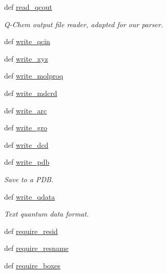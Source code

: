 \begin{DoxyCompactItemize}
\item 
def \hyperlink{classforcebalance_1_1molecule_1_1Molecule_a8c9e71843e7123c57c43c24af2d84f25}{read\-\_\-qcout}
\begin{DoxyCompactList}\small\item\em Q-\/\-Chem output file reader, adapted for our parser. \end{DoxyCompactList}\item 
def \hyperlink{classforcebalance_1_1molecule_1_1Molecule_af46b2ba6ef777cf8301bc16e157c724d}{write\-\_\-qcin}
\item 
def \hyperlink{classforcebalance_1_1molecule_1_1Molecule_adc6620e8287edabe161442de12295f75}{write\-\_\-xyz}
\item 
def \hyperlink{classforcebalance_1_1molecule_1_1Molecule_aba14226f272f91c91ecf7060ff136a2b}{write\-\_\-molproq}
\item 
def \hyperlink{classforcebalance_1_1molecule_1_1Molecule_aab5ea35ab9d68559fd6ea7b747c2bddb}{write\-\_\-mdcrd}
\item 
def \hyperlink{classforcebalance_1_1molecule_1_1Molecule_a95782abfb36e7080a1b98bfad2ced4f3}{write\-\_\-arc}
\item 
def \hyperlink{classforcebalance_1_1molecule_1_1Molecule_a503eae2cee228e4cc5fc736504714925}{write\-\_\-gro}
\item 
def \hyperlink{classforcebalance_1_1molecule_1_1Molecule_a0dee435704418bf51199d6bab6d92249}{write\-\_\-dcd}
\item 
def \hyperlink{classforcebalance_1_1molecule_1_1Molecule_a47082443566cd50add3f2ec20af9cc10}{write\-\_\-pdb}
\begin{DoxyCompactList}\small\item\em Save to a P\-D\-B. \end{DoxyCompactList}\item 
def \hyperlink{classforcebalance_1_1molecule_1_1Molecule_a1ef6aefd3218f8ab3f9dc2b37e602fbf}{write\-\_\-qdata}
\begin{DoxyCompactList}\small\item\em Text quantum data format. \end{DoxyCompactList}\item 
def \hyperlink{classforcebalance_1_1molecule_1_1Molecule_a90fe456919fda305703e36af389e60e1}{require\-\_\-resid}
\item 
def \hyperlink{classforcebalance_1_1molecule_1_1Molecule_ad47d05a3ea76e013a628bd7b25ae3050}{require\-\_\-resname}
\item 
def \hyperlink{classforcebalance_1_1molecule_1_1Molecule_a03af3cfb99ea8f1c8c7e93d04bdcf967}{require\-\_\-boxes}
\end{DoxyCompactItemize}
